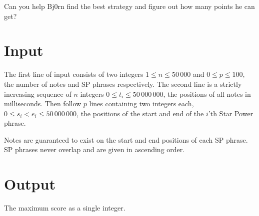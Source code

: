 Can you help Bj0rn find the best strategy and figure out how many points he can get?

\section*{Input}
The first line of input consists of two integers $1 \leq n \leq 50\,000$ and $0 \leq p \leq 100$, the
number of notes and SP phrases respectively. The second line is a strictly increasing sequence of
$n$ integers $0 \leq t_i \leq 50\,000\,000$, the positions of all notes in milliseconds. Then follow
$p$ lines containing two integers each, $0 \leq s_i < e_i \leq 50\,000\,000$,
the positions of the start and end of the $i$'th Star Power phrase.

Notes are guaranteed to exist on the start and end positions of each SP phrase. SP phrases never
overlap and are given in ascending order.

\section*{Output}
The maximum score as a single integer.
